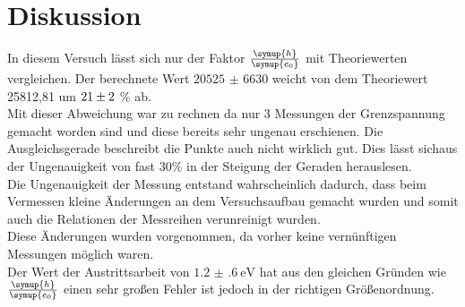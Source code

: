 \section{Diskussion}
    In diesem Versuch lässt sich nur der Faktor $\frac{\symup{h}}{\symup{e_0}}$ mit Theoriewerten vergleichen.
    Der berechnete Wert $\num{20525(6630)}$ weicht von dem Theoriewert 25812,81 um $\num{21 (2)}$ \% ab.\\
    Mit dieser Abweichung war zu rechnen da nur 3 Messungen der Grenzspannung gemacht worden sind und diese bereits sehr ungenau erschienen.
    Die Ausgleichsgerade beschreibt die Punkte auch nicht wirklich gut. Dies lässt sichaus der Ungenauigkeit von fast 30\% in der 
    Steigung der Geraden herauslesen.\\
    Die Ungenauigkeit der Messung entstand wahrscheinlich dadurch, dass beim Vermessen kleine Änderungen an dem 
    Versuchsaufbau gemacht wurden und somit auch die Relationen der Messreihen verunreinigt wurden. \\
    Diese Änderungen wurden vorgenommen, da vorher keine vernünftigen Messungen möglich waren.\\
    Der Wert der Austrittsarbeit von $\SI{1.2(6)}{\electronvolt}$ hat aus den gleichen Gründen wie $\frac{\symup{h}}{\symup{e_0}}$ einen sehr 
    großen Fehler ist jedoch in der richtigen Größenordnung.